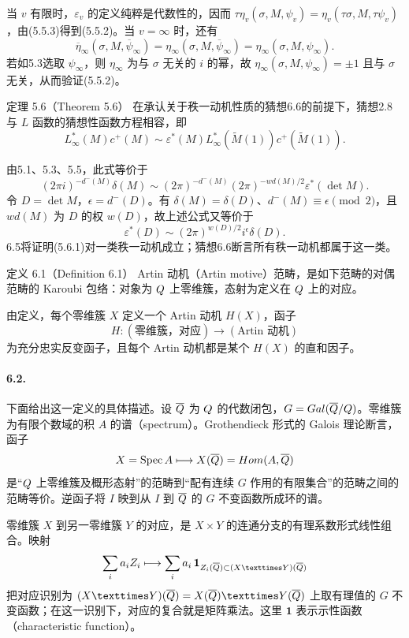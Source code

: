 当 $v$ 有限时，$\varepsilon_v$ 的定义纯粹是代数性的，因而
$\tau\eta_v(\sigma,M,\psi_v)=\eta_v(\tau\sigma,M,\tau\psi_v)$，由(5.5.3)得到(5.5.2)。当 $v=\infty$ 时，还有
\[
 \overline\eta_\infty(\sigma,M,\overline\psi_\infty)
 =\eta_\infty(\sigma,M,\overline\psi_\infty)
 =\eta_\infty(\sigma,M,\psi_\infty).
\]
若如5.3选取 $\psi_\infty$，则 $\eta_\infty$ 为与 $\sigma$ 无关的 $i$ 的幂，故 $\eta_\infty(\sigma,M,\psi_\infty)=\pm1$ 且与 $\sigma$ 无关，从而验证(5.5.2)。

\begin{originaltheorem}{定理 5.6（Theorem 5.6）}
在承认关于秩一动机性质的猜想6.6的前提下，猜想2.8与 $L$ 函数的猜想性函数方程相容，即
\[
 L_\infty^*(M)c^+(M)
 \sim\varepsilon^*(M)L_\infty^*(\widetilde M(1))c^+(\widetilde M(1)).
\]
\end{originaltheorem}
由5.1、5.3、5.5，此式等价于
\[
 (2\pi i)^{-d^-(M)}\delta(M)
 \sim(2\pi)^{-d^-(M)}(2\pi)^{-wd(M)/2}\varepsilon^*(\det M).
\]
令 $D=\det M$，$\epsilon=d^-(D)$。有 $\delta(M)=\delta(D)$、$d^-(M)\equiv\epsilon\pmod2$，且 $wd(M)$ 为 $D$ 的权 $w(D)$，故上述公式又等价于
\[
 \varepsilon^*(D)\sim(2\pi)^{w(D)/2}i^\epsilon\delta(D).\tag{5.6.1}
\]
6.5将证明(5.6.1)对一类秩一动机成立；猜想6.6断言所有秩一动机都属于这一类。

\begin{originaltheorem}{定义 6.1（Definition 6.1）}
Artin 动机（Artin motive）范畴，是如下范畴的对偶范畴的 Karoubi 包络：对象为 $Q$ 上零维簇，态射为定义在 $Q$ 上的对应。
\end{originaltheorem}
由定义，每个零维簇 $X$ 定义一个 Artin 动机 $H(X)$，函子
\[
 H:(\text{零维簇，对应})\longrightarrow(\text{Artin 动机})
\]
为充分忠实反变函子，且每个 Artin 动机都是某个 $H(X)$ 的直和因子。

\paragraph*{6.2.}
下面给出这一定义的具体描述。设 $\overline{Q}$ 为 $Q$ 的代数闭包，$G=Gal(\overline{Q}/Q)$。零维簇为有限个数域的积 $A$ 的谱（spectrum）。Grothendieck 形式的 Galois 理论断言，函子
\[
 X=\operatorname{Spec} A\longmapsto X(\overline{Q})=Hom(A,\overline{Q})
\]
是“$Q$ 上零维簇及概形态射”的范畴到“配有连续 $G$ 作用的有限集合”的范畴之间的范畴等价。逆函子将 $I$ 映到从 $I$ 到 $\overline{Q}$ 的 $G$ 不变函数所成环的谱。

零维簇 $X$ 到另一零维簇 $Y$ 的对应，是 $X\times Y$ 的连通分支的有理系数形式线性组合。映射
\[
 \sum_i a_iZ_i\longmapsto\sum_i a_i\,\boldsymbol1_{Z_i(\overline\Q)\subset(X\times Y)(\overline\Q)}
\]
把对应识别为 $(X\times Y)(\overline\Q)=X(\overline\Q)\times Y(\overline\Q)$ 上取有理值的 $G$ 不变函数；在这一识别下，对应的复合就是矩阵乘法。这里 $\boldsymbol1$ 表示示性函数（characteristic function）。


